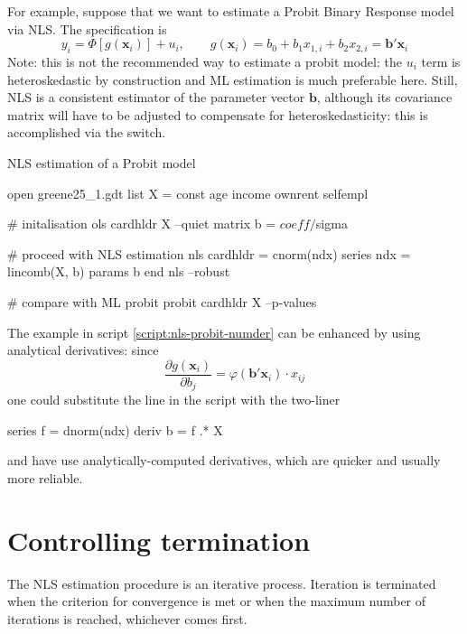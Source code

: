For example, suppose that we want to estimate a Probit Binary Response
model via NLS. The specification is
\begin{equation}
\label{eq:probit-nls}
y_i = \Phi\left[g(\bm{x}_i)\right] + u_i, \qquad g(\bm{x}_i) = b_0 +
b_1 x_{1,i} + b_2 x_{2,i} = \bm{b}'\bm{x}_i
\end{equation}
Note: this is not the recommended way to estimate a probit model: the
$u_i$ term is heteroskedastic by construction and ML estimation is
much preferable here. Still, NLS is a consistent estimator of the
parameter vector $\bm{b}$, although its covariance matrix will have to
be adjusted to compensate for heteroskedasticity: this is accomplished
via the  switch.

\begin{script}[htbp]
  \caption{NLS estimation of a Probit model}
  \label{script:nls-probit-numder}
  \begin{scode}
    open greene25_1.gdt
    list X = const age income ownrent selfempl

    # initalisation
    ols cardhldr X --quiet
    matrix b = $coeff / $sigma

    # proceed with NLS estimation
    nls cardhldr = cnorm(ndx)
        series ndx = lincomb(X, b)
        params b
    end nls --robust

    # compare with ML probit 
    probit cardhldr X --p-values
  \end{scode}
\end{script}

The example in script \ref{script:nls-probit-numder} can be enhanced by
using analytical derivatives: since
\[
\frac{\partial g(\bm{x}_i)}{\partial b_j} = \varphi(\bm{b}'\bm{x}_i) \cdot x_{ij}
\]
one could substitute the  line in the script with the two-liner
\begin{code}
  series f = dnorm(ndx)
  deriv b = {f} .* {X}
\end{code}
and have  use analytically-computed derivatives, which are
quicker and usually more reliable.

\section{Controlling termination}
\label{nls-toler}

The NLS estimation procedure is an iterative process.  Iteration is
terminated when the criterion for convergence is met or when the
maximum number of iterations is reached, whichever comes first.

